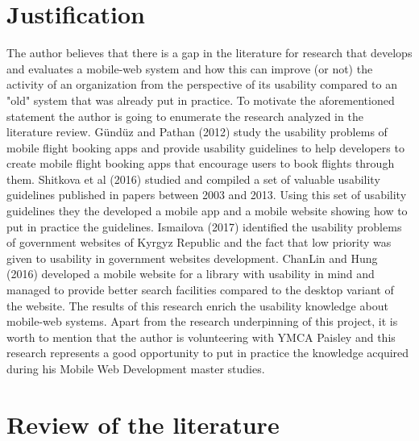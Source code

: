 \documentclass[version=last,fontsize=13pt]{scrartcl}
\begin{document}
\section{Justification} %
	\indent
	The author believes that there is a gap in the literature for  research that develops  and evaluates a mobile-web system and how this can improve (or not) the activity of an organization from the perspective of its usability compared to an "old" system that was already put in practice. To motivate the aforementioned statement the author is going to enumerate the research analyzed in the literature review. Gündüz and Pathan (2012) study the usability problems of mobile flight booking apps and provide usability guidelines to help developers to create mobile flight booking apps that encourage users to book flights through them. Shitkova et al (2016) studied and compiled a set of valuable usability guidelines published in papers between 2003 and 2013. Using this set of usability guidelines they the developed a mobile app and a mobile website showing how to put in practice the guidelines. Ismailova (2017) identified the usability problems of government websites of Kyrgyz Republic and the fact that low priority was given to usability in government websites development. ChanLin and Hung (2016) developed a mobile website for a library with usability in mind and managed to provide better search facilities compared to the desktop variant of the website. The results of this research enrich the usability knowledge about mobile-web systems. Apart from the research underpinning of this project, it is worth to mention that the author is volunteering with YMCA Paisley and this research represents a good opportunity to put in practice the knowledge acquired during his Mobile Web Development master studies.\\



\section{Review of the literature } %
\end{document}
